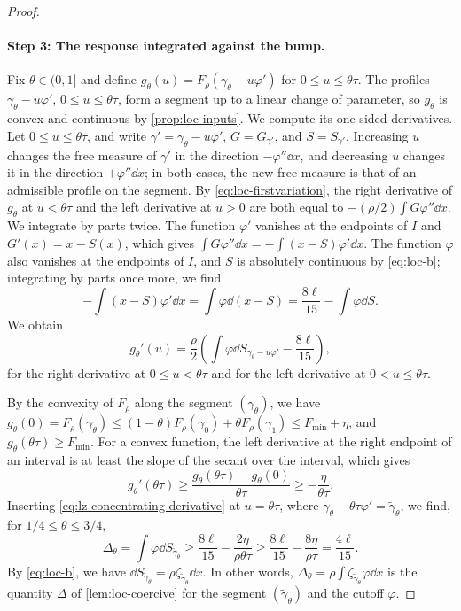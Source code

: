 \begin{proof}
\paragraph{Step 3: The response integrated against the bump.}
Fix $\theta\in(0,1]$ and define $g_\theta(u)=F_\rho(\gamma_\theta-u\varphi')$
for $0\le u\le\theta\tau$. The profiles $\gamma_\theta-u\varphi'$,
$0\le u\le\theta\tau$, form a segment up to a linear change of parameter, so
$g_\theta$ is convex and continuous by \cref{prop:loc-inputs}. We compute its
one-sided derivatives. Let $0\le u\le\theta\tau$, and write
$\gamma'=\gamma_\theta-u\varphi'$, $G=G_{\gamma'}$, and $S=S_{\gamma'}$.
Increasing $u$ changes the free measure of $\gamma'$ in the direction
$-\varphi''\dd x$, and decreasing $u$ changes it in the direction
$+\varphi''\dd x$; in both cases, the new free measure is that of an
admissible profile on the segment. By \eqref{eq:loc-firstvariation}, the right
derivative of $g_\theta$ at $u<\theta\tau$ and the left derivative at $u>0$
are both equal to $-(\rho/2)\int G\varphi''\dd x$. We integrate by parts
twice. The function $\varphi'$ vanishes at the endpoints of $I$ and
$G'(x)=x-S(x)$, which gives $\int G\varphi''\dd x=-\int(x-S)\varphi'\dd x$. The
function $\varphi$ also vanishes at the endpoints of $I$, and $S$ is absolutely
continuous by \eqref{eq:loc-b}; integrating by parts once more, we find
\[
 -\int(x-S)\varphi'\dd x=\int\varphi\dd(x-S)=\frac{8\ell}{15}-\int\varphi\dd S .
\]
We obtain
\begin{equation}\label{eq:lz-concentrating-derivative}
 g_\theta'(u)=\frac\rho2
          \left(\int\varphi\dd S_{\gamma_\theta-u\varphi'}-\frac{8\ell}{15}\right),
\end{equation}
for the right derivative at $0\le u<\theta\tau$ and for the left derivative
at $0<u\le\theta\tau$.

By the convexity of $F_\rho$ along the segment $(\gamma_\theta)$, we have
$g_\theta(0)=F_\rho(\gamma_\theta)\le(1-\theta)F_\rho(\gamma_0)
+\theta F_\rho(\gamma_1)\le F_{\min}+\eta$, and $g_\theta(\theta\tau)\ge
F_{\min}$. For a convex function, the left derivative at the right endpoint
of an interval is at least the slope of the secant over the interval, which
gives
\[
 g_\theta'(\theta\tau)\ge\frac{g_\theta(\theta\tau)-g_\theta(0)}{\theta\tau}
 \ge-\frac\eta{\theta\tau}.
\]
Inserting \eqref{eq:lz-concentrating-derivative} at $u=\theta\tau$, where
$\gamma_\theta-\theta\tau\varphi'=\widetilde\gamma_\theta$, we find, for
$1/4\le\theta\le3/4$,
\[
 \Delta_\theta=\int\varphi\dd S_{\widetilde\gamma_\theta}
 \ge\frac{8\ell}{15}-\frac{2\eta}{\rho\theta\tau}
 \ge\frac{8\ell}{15}-\frac{8\eta}{\rho\tau}=\frac{4\ell}{15}.
\]
By \eqref{eq:loc-b}, we have $\dd S_{\widetilde\gamma_\theta}
=\rho\zeta_{\widetilde\gamma_\theta}\dd x$. In other words,
$\Delta_\theta=\rho\int\zeta_{\widetilde\gamma_\theta}\varphi\dd x$ is the
quantity $\Delta$ of \cref{lem:loc-coercive} for the segment
$(\widetilde\gamma_\theta)$ and the cutoff $\varphi$.


\end{proof}
